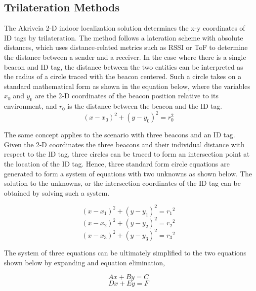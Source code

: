 \subsection{Trilateration Methods}
\medskip
The Akriveia 2-D indoor localization solution determines the x-y coordinates of ID tags by trilateration. The method follows a lateration scheme with absolute distances, which uses distance-related metrics such as RSSI or ToF to determine the distance between a sender and a receiver. In the case where there is a single beacon and ID tag, the distance between the two entities can be interpreted as the radius of a circle traced with the beacon centered. Such a circle takes on a standard mathematical form as shown in the equation below, where the variables $x_0$ and $y_0$ are the 2-D coordinates of the beacon position relative to its environment, and $r_0$ is the distance between the beacon and the ID tag. 
\medskip
\begin{equation*}
	(x-x_{0})^2 + (y-y_{0})^2 = r_{0}^2
\end{equation*}

\medskip
The same concept applies to the scenario with three beacons and an ID tag. Given the 2-D coordinates the three beacons and their individual distance with respect to the ID tag, three circles can be traced to form an intersection point at the location of the ID tag. Hence, three standard form circle equations are generated to form a system of equations with two unknowns as shown below. The solution to the unknowns, or the intersection coordinates of the ID tag can be obtained by solving such a system.


\begin{equation*}
	(x-x_1)^2 + (y-y_1)^2 = {r_1}^2 
\end{equation*}
\begin{equation*}
	(x-x_2)^2 + (y-y_2)^2 = {r_2}^2 
\end{equation*}
\begin{equation*}
	(x-x_3)^2 + (y-y_3)^2 = {r_3}^2  
\end{equation*}

\medskip
The system of three equations can be ultimately simplified to the two equations shown below by expanding and equation elimination,

\begin{equation*}
	Ax + By = C
\end{equation*}
\begin{equation*}
	Dx + Ey = F
\end{equation*}

